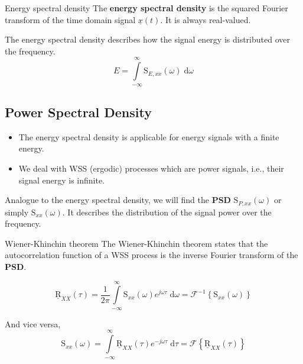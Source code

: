 \begin{refsection}
\begin{definition}{Energy spectral density}
	The  \textbf{energy spectral density} is the squared Fourier transform of the time domain signal $\underline{x}(t)$. It is always real-valued.
\end{definition}

The energy spectral density describes how the signal energy is distributed over the frequency.
\begin{equation}
	E = \int\limits_{-\infty}^{\infty} \mathrm{S}_{E,xx}(\omega) \; \mathrm{d} \omega
\end{equation}

\subsection{Power Spectral Density}

\begin{itemize}
	\item The energy spectral density is applicable for energy signals with a finite energy.
	\item We deal with \ac{WSS} (ergodic) processes which are power signals, i.e., their signal energy is infinite.
\end{itemize}

Analogue to the energy spectral density, we will find the  \textbf{\ac{PSD}} $\mathrm{S}_{P,xx}(\omega)$ or simply $\mathrm{S}_{xx}(\omega)$. It describes the distribution of the signal power over the frequency. 

\begin{definition}{Wiener-Khinchin theorem}
	The  Wiener-Khinchin theorem states that the autocorrelation function of a \ac{WSS} process is the inverse Fourier transform of the  \textbf{\ac{PSD}}.
	
	\begin{equation}
		\underline{\mathrm{R}}_{XX}(\tau) = \frac{1}{2 \pi} \int\limits_{-\infty}^{\infty} \mathrm{S}_{xx}(\omega) e^{j \omega \tau} \; \mathrm{d} \omega = \mathcal{F}^{-1} \left\{\mathrm{S}_{xx}(\omega)\right\}
	\end{equation}
	
	And vice versa,
	\begin{equation}
		\mathrm{S}_{xx}(\omega) = \int\limits_{-\infty}^{\infty} \underline{\mathrm{R}}_{XX}(\tau) e^{-j \omega \tau} \; \mathrm{d} \tau = \mathcal{F}\left\{\underline{\mathrm{R}}_{XX}(\tau)\right\}
		\label{eq:ch03:psd_def}
	\end{equation}
\end{definition}


\end{refsection}
